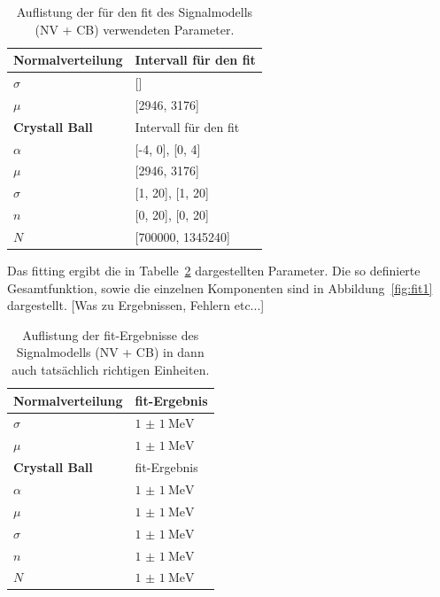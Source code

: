 %
\begin{table}[H]
  \centering
  \caption{Auflistung der für den fit des Signalmodells (NV + CB) verwendeten Parameter.}
  \begin{tabular}{ll}
    \toprule
    \textbf{Normalverteilung}   & Intervall für den fit \\
    \midrule
    \quad$\sigma$               & []  \\
    \quad$\mu$                  & [2946, 3176]  \\
    \midrule
    \textbf{Crystall Ball}      &  Intervall für den fit \\
    \midrule
    \quad$\alpha$               & [-4, 0], [0, 4] \\
    \quad$\mu$                  & [2946, 3176] \\
    \quad$\sigma$               & [1, 20], [1, 20] \\
    \quad$n$                    & [0, 20], [0, 20] \\
    \quad$N$                    & [700000, 1345240] \\
    \bottomrule
  \end{tabular}
  \label{tab:params1}
\end{table}
%
Das fitting ergibt die in Tabelle~\ref{tab:fit1} dargestellten Parameter. Die so definierte Gesamtfunktion, sowie die einzelnen Komponenten sind in Abbildung~\ref{fig:fit1} dargestellt. [Was zu Ergebnissen, Fehlern etc...]
%
\begin{table}[H]
  \centering
  \caption{Auflistung der fit-Ergebnisse des Signalmodells (NV + CB) in dann auch tatsächlich richtigen Einheiten.}
  \begin{tabular}{ll}
    \toprule
    \textbf{Normalverteilung}   & fit-Ergebnis \\
    \midrule
    \quad$\sigma$               & $\SI{1(1)}{\mega\electronvolt}$  \\
    \quad$\mu$                  & $\SI{1(1)}{\mega\electronvolt}$  \\
    \midrule
    \textbf{Crystall Ball}      &  fit-Ergebnis \\
    \midrule
    \quad$\alpha$               & $\SI{1(1)}{\mega\electronvolt}$ \\
    \quad$\mu$                  & $\SI{1(1)}{\mega\electronvolt}$ \\
    \quad$\sigma$               & $\SI{1(1)}{\mega\electronvolt}$ \\
    \quad$n$                    & $\SI{1(1)}{\mega\electronvolt}$ \\
    \quad$N$                    & $\SI{1(1)}{\mega\electronvolt}$ \\
    \bottomrule
  \end{tabular}
  \label{tab:fit1}
\end{table}

